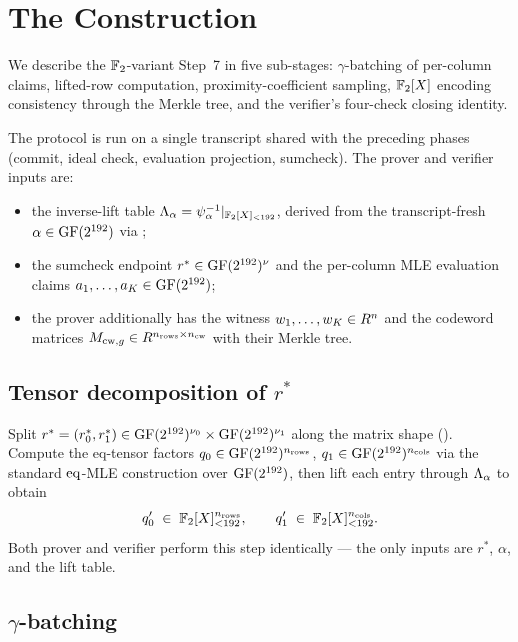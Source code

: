 \section{The Construction}
\label{sec:construction}

We describe the $\mathbb{F}_2$-variant Step~7 in five sub-stages:
$\gamma$-batching of per-column claims, lifted-row computation,
proximity-coefficient sampling, $\mathbb{F}_2[X]$ encoding consistency
through the Merkle tree, and the verifier's four-check closing
identity.

The protocol is run on a single transcript shared with the preceding
phases (commit, ideal check, evaluation projection, sumcheck). The
prover and verifier inputs are:
\begin{itemize}[leftmargin=2em]
  \item the inverse-lift table $\Lambda_{\alpha} = \psi_{\alpha}^{-1}|_{\mathbb{F}_2[X]_{<192}}$,
    derived from the transcript-fresh $\alpha \in \mathrm{GF}(2^{192})$ via
    ;
  \item the sumcheck endpoint $r^* \in \mathrm{GF}(2^{192})^{\nu}$ and the per-column
    MLE evaluation claims $a_1, \ldots, a_K \in \mathrm{GF}(2^{192})$;
  \item the prover additionally has the witness $w_1, \ldots, w_K \in
    R^n$ and the codeword matrices
    $M_{\mathrm{cw}, g} \in R^{n_{\mathrm{rows}} \times
    n_{\mathrm{cw}}}$ with their Merkle tree.
\end{itemize}

\subsection{Tensor decomposition of $r^*$}
\label{sec:tensor}

Split $r^* = (r_0^*, r_1^*) \in \mathrm{GF}(2^{192})^{\nu_0} \times \mathrm{GF}(2^{192})^{\nu_1}$
along the matrix shape (). Compute the eq-tensor
factors $q_0 \in \mathrm{GF}(2^{192})^{n_{\mathrm{rows}}}$, $q_1 \in
\mathrm{GF}(2^{192})^{n_{\mathrm{cols}}}$ via the standard $\operatorname{eq}$-MLE construction
over $\mathrm{GF}(2^{192})$, then lift each entry through $\Lambda_{\alpha}$ to obtain
\[
  q_0' \;\in\; \mathbb{F}_2[X]_{<192}^{n_{\mathrm{rows}}},
  \qquad
  q_1' \;\in\; \mathbb{F}_2[X]_{<192}^{n_{\mathrm{cols}}}.
\]
Both prover and verifier perform this step identically — the only
inputs are $r^*$, $\alpha$, and the lift table.

\subsection{$\gamma$-batching}
\label{sec:gamma-batch}

